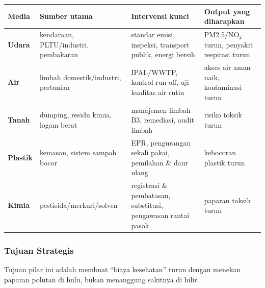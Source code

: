 \documentclass[
  letterpaper,
  DIV=11,
  numbers=noendperiod]{scrreprt}
\begin{document}
\begin{longtable}[]{@{}
  >{\raggedright\arraybackslash}p{}
  >{\raggedright\arraybackslash}p{}
  >{\raggedright\arraybackslash}p{}
  >{\raggedright\arraybackslash}p{}@{}}
\toprule\noalign{}
\begin{minipage}[b]{\linewidth}\raggedright
Media
\end{minipage} & \begin{minipage}[b]{\linewidth}\raggedright
Sumber utama
\end{minipage} & \begin{minipage}[b]{\linewidth}\raggedright
Intervensi kunci
\end{minipage} & \begin{minipage}[b]{\linewidth}\raggedright
Output yang diharapkan
\end{minipage} \\
\midrule\noalign{}
\endhead
\bottomrule\noalign{}
\endlastfoot
\textbf{Udara} & kendaraan, PLTU/industri, pembakaran & standar emisi,
inspeksi, transport publik, energi bersih & PM2.5/NO₂ turun, penyakit
respirasi turun \\
\textbf{Air} & limbah domestik/industri, pertanian & IPAL/WWTP, kontrol
run-off, uji kualitas air rutin & akses air aman naik, kontaminasi
turun \\
\textbf{Tanah} & dumping, residu kimia, logam berat & manajemen limbah
B3, remediasi, audit limbah & risiko toksik turun \\
\textbf{Plastik} & kemasan, sistem sampah bocor & EPR, pengurangan
sekali pakai, pemilahan \& daur ulang & kebocoran plastik turun \\
\textbf{Kimia} & pestisida/merkuri/solven & registrasi \& pembatasan,
substitusi, pengawasan rantai pasok & paparan toksik turun \\
\end{longtable}

\subsubsection{Tujuan Strategis}\label{tujuan-strategis-1}

\begin{tcolorbox}[enhanced jigsaw, colback=white, colframe=quarto-callout-tip-color-frame, left=2mm, arc=.35mm, bottomrule=.15mm, opacityback=0, opacitybacktitle=0.6, coltitle=black, toprule=.15mm, colbacktitle=quarto-callout-tip-color!10!white, breakable, titlerule=0mm, leftrule=.75mm, title=\textcolor{quarto-callout-tip-color}{\faLightbulb}\hspace{0.5em}{Tip}, toptitle=1mm, bottomtitle=1mm, rightrule=.15mm]

Tujuan pilar ini adalah membuat ``biaya kesehatan'' turun dengan menekan
paparan polutan di hulu, bukan menanggung sakitnya di hilir.

\end{tcolorbox}
\end{document}
